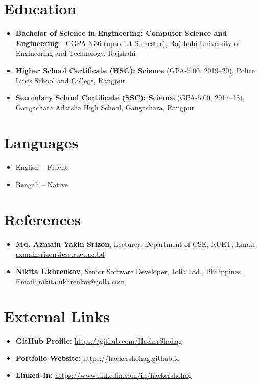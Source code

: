 \documentclass{article}
\begin{document}
\begin{adjustwidth}{0cm}{0cm}
\begin{multicols}{2}
        \section*{Education}
        \begin{itemize}
            \item \textbf{Bachelor of Science in Engineering: Computer Science and Engineering} - CGPA-3.36 (upto 1st Semester), Rajshahi University of Engineering and Technology, Rajshahi
            \item \textbf{Higher School Certificate (HSC): Science} (GPA-5.00, 2019–20), Police Lines School and College, Rangpur
            \item \textbf{Secondary School Certificate (SSC): Science} (GPA-5.00, 2017–18), Gangachara Adarsha High School, Gangachara, Rangpur
        \end{itemize}

        \section*{Languages}
        \begin{itemize}
            \item English – Fluent
            \item Bengali – Native
        \end{itemize}

        \section*{References}
        \begin{itemize}
            \item \textbf{Md. Azmain Yakin Srizon}, Lecturer, Department of CSE, RUET, Email: \href{mailto:azmainsrizon@cse.ruet.ac.bd}{azmainsrizon@cse.ruet.ac.bd}
            \item \textbf{Nikita Ukhrenkov}, Senior Software Developer, Jolla Ltd., Philippines, Email: \href{mailto:nikita.ukhrenkov@jolla.com}{nikita.ukhrenkov@jolla.com}
        \end{itemize}

        \section*{External Links}
        \begin{itemize}
            \item \textbf{GitHub Profile:} \href{https://github.com/HackerShohag}{https://github.com/HackerShohag}
            \item \textbf{Portfolio Website:} \href{https://hackershohag.github.io}{https://hackershohag.github.io}
            \item \textbf{Linked-In:} \href{https://www.linkedin.com/in/hackershohag}{https://www.linkedin.com/in/hackershohag}
        \end{itemize}
    \end{multicols}
\end{adjustwidth}
\end{document}
